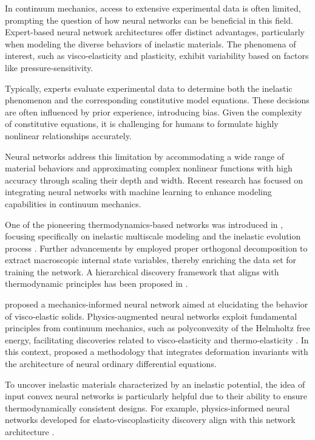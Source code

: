 In continuum mechanics, access to extensive experimental data is often limited, prompting the question of how neural networks can be beneficial in this field. Expert-based neural network architectures offer distinct advantages, particularly when modeling the diverse behaviors of inelastic materials. The phenomena of interest, such as visco-elasticity and plasticity, exhibit variability based on factors like pressure-sensitivity.

Typically, experts evaluate experimental data to determine both the inelastic phenomenon and the corresponding constitutive model equations. These decisions are often influenced by prior experience, introducing bias. Given the complexity of constitutive equations, it is challenging for humans to formulate highly nonlinear relationships accurately.

Neural networks address this limitation by accommodating a wide range of material behaviors and approximating complex nonlinear functions with high accuracy through scaling their depth and width. Recent research has focused on integrating neural networks with machine learning to enhance modeling capabilities in continuum mechanics.

One of the pioneering thermodynamics-based networks was introduced in \cite{masi2021}, focusing specifically on inelastic multiscale modeling \cite{masi2022} and the inelastic evolution process \cite{masi2023}. Further advancements by \cite{Piunno2025} employed proper orthogonal decomposition to extract macroscopic internal state variables, thereby enriching the data set for training the network.
A hierarchical discovery framework that aligns with thermodynamic principles has been proposed in \cite{ZHANG2025106049}.

\citet{asad2023cmame} proposed a mechanics-informed neural network \cite{asad2022} aimed at elucidating the behavior of visco-elastic solids. Physics-augmented neural networks \cite{Klein_Roth_Valizadeh_Weeger_2023,KALINA2024116739} exploit fundamental principles from continuum mechanics, such as polyconvexity of the Helmholtz free energy, facilitating discoveries related to visco-elasticity \cite{rosenkranz2024} and thermo-elasticity \cite{fuhg2024polyconvexneuralnetworkmodels}. In this context, \cite{TAC2022115248} proposed a methodology that integrates deformation invariants with the architecture of neural ordinary differential equations.

To uncover inelastic materials characterized by an inelastic potential, the idea of input convex neural networks \cite{Amos2017} is particularly helpful due to their ability to ensure thermodynamically consistent designs. For example, physics-informed neural networks developed for elasto-viscoplasticity discovery align with this network architecture \cite{EGHTESAD2024104072}.

